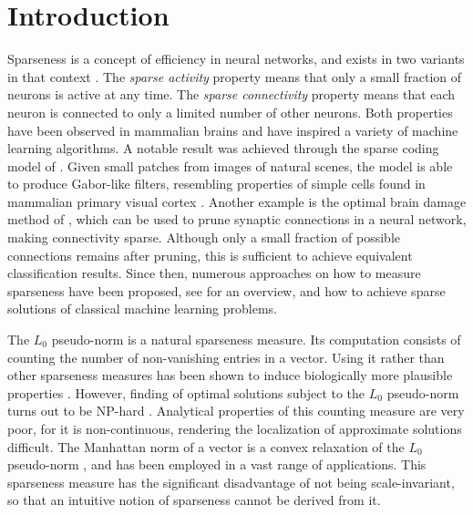 \documentclass[twoside,11pt]{article}
\newcommand{\0}{\mathcal{O}}
\begin{document}
\section{Introduction}
\label{sect:introduction}
Sparseness is a concept of efficiency in neural networks, and exists in two variants in that context \citep{Laughlin2003}.
The \emph{sparse activity} property means that only a small fraction of neurons is active at any time.
The \emph{sparse connectivity} property means that each neuron is connected to only a limited number of other neurons.
Both properties have been observed in mammalian brains \citep{Hubel1959,Olshausen2004,Mason1991,Markram1997} and have inspired a variety of machine learning algorithms.
A notable result was achieved through the sparse coding model of \citet{Olshausen1996}.
Given small patches from images of natural scenes, the model is able to produce Gabor-like filters, resembling properties of simple cells found in mammalian primary visual cortex \citep{Hubel1959,Vinje2000}.
Another example is the optimal brain damage method of \citet{LeCun1990}, which can be used to prune synaptic connections in a neural network, making connectivity sparse.
Although only a small fraction of possible connections remains after pruning, this is sufficient to achieve equivalent classification results.
Since then, numerous approaches on how to measure sparseness have been proposed, see \citet{Hurley2009} for an overview, and how to achieve sparse solutions of classical machine learning problems.

The $L_0$ pseudo-norm is a natural sparseness measure.
Its computation consists of counting the number of non-vanishing entries in a vector.
Using it rather than other sparseness measures has been shown to induce biologically more plausible properties \citep{Rehn2007}.
However, finding of optimal solutions subject to the $L_0$ pseudo-norm turns out to be NP-hard \citep{Natarajan1995,Weston2003}.
Analytical properties of this counting measure are very poor, for it is non-continuous, rendering the localization of approximate solutions difficult.
The Manhattan norm of a vector is a convex relaxation of the $L_0$ pseudo-norm \citep{Donoho2006a}, and has been employed in a vast range of applications.
This sparseness measure has the significant disadvantage of not being scale-invariant, so that an intuitive notion of sparseness cannot be derived from it.
\end{document}
